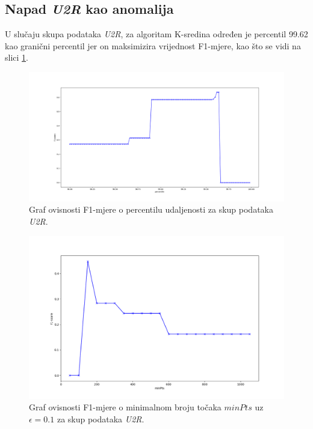 \documentclass[utf8, diplomski, numeric]{fer}
\begin{document}
\subsection{Napad \textit{U2R} kao anomalija}
U slučaju skupa podataka \textit{U2R}, za algoritam K-sredina određen je percentil 99.62 kao granični percentil jer on maksimizira vrijednost F1-mjere, kao što se vidi na slici \ref{fig:u2r-kmeans}.

\begin{figure}[htb]
\includegraphics[width=1\textwidth]{images/u2r-kmeans-f1.png}
\centering
\caption{Graf ovisnosti F1-mjere o percentilu udaljenosti za skup podataka \textit{U2R}.}
\label{fig:u2r-kmeans}
\end{figure}

\begin{figure}[h!]
\includegraphics[width=1\textwidth]{images/u2r-dbscan-f1.png}
\centering
\caption{Graf ovisnosti F1-mjere o minimalnom broju točaka $minPts$ uz $\epsilon = 0.1$ za skup podataka \textit{U2R}.}
\label{fig:u2r-dbscan}
\end{figure}
\end{document}

